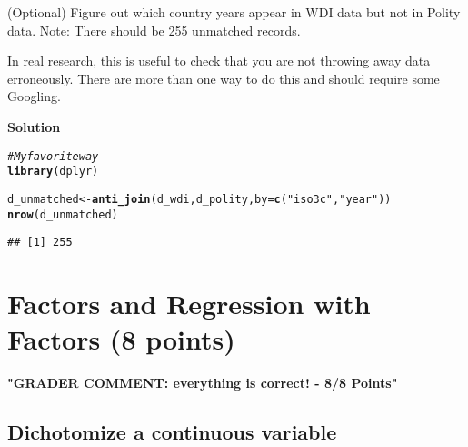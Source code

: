 \documentclass{article}\usepackage[]{graphicx}\usepackage[]{color}
\makeatletter
\newcommand{\hlstr}[1]{\textcolor[rgb]{0.192,0.494,0.8}{#1}}%
\newcommand{\hlcom}[1]{\textcolor[rgb]{0.678,0.584,0.686}{\textit{#1}}}%
\newcommand{\hlstd}[1]{\textcolor[rgb]{0.345,0.345,0.345}{#1}}%
\newcommand{\hlkwb}[1]{\textcolor[rgb]{0.69,0.353,0.396}{#1}}%
\newcommand{\hlkwc}[1]{\textcolor[rgb]{0.333,0.667,0.333}{#1}}%
\newcommand{\hlkwd}[1]{\textcolor[rgb]{0.737,0.353,0.396}{\textbf{#1}}}%
\newenvironment{kframe}{%
 \def\at@end@of@kframe{}%
 \ifinner\ifhmode%
  \def\at@end@of@kframe{\end{minipage}}%
  \begin{minipage}{\columnwidth}%
 \fi\fi%
 \def\FrameCommand##1{\hskip\@totalleftmargin \hskip-\fboxsep
 \colorbox{shadecolor}{##1}\hskip-\fboxsep
     \hskip-\linewidth \hskip-\@totalleftmargin \hskip\columnwidth}%
 \MakeFramed {\advance\hsize-\width
   \@totalleftmargin\z@ \linewidth\hsize
   \@setminipage}}%
 {\par\unskip\endMakeFramed%
 \at@end@of@kframe}
\newenvironment{knitrout}{}{} %
\makeatother
\begin{document}
(Optional) Figure out which country years appear in WDI data but not in Polity data. Note: There should be 255 unmatched records.

In real research, this is useful to check that you are not throwing away data erroneously. There are more than one way to do this and should require some Googling.

\textbf{Solution}

\begin{knitrout}
\color{fgcolor}\begin{kframe}
\begin{alltt}
\hlcom{# My favorite way}
\hlkwd{library}\hlstd{(dplyr)}
\end{alltt}


{\ttfamily\noindent\itshape\color{messagecolor}{\#\# \\\#\# Attaching package: 'dplyr'\\\#\# \\\#\# The following objects are masked from 'package:stats':\\\#\# \\\#\#\ \ \ \  filter, lag\\\#\# \\\#\# The following objects are masked from 'package:base':\\\#\# \\\#\#\ \ \ \  intersect, setdiff, setequal, union}}\begin{alltt}
\hlstd{d_unmatched} \hlkwb{<-} \hlkwd{anti_join}\hlstd{(d_wdi, d_polity,} \hlkwc{by} \hlstd{=} \hlkwd{c}\hlstd{(}\hlstr{"iso3c"}\hlstd{,} \hlstr{"year"}\hlstd{))}
\hlkwd{nrow}\hlstd{(d_unmatched)}
\end{alltt}
\begin{verbatim}
## [1] 255
\end{verbatim}
\end{kframe}
\end{knitrout}

\section{Factors and Regression with Factors (8 points)}

\textbf{\color{red} "GRADER COMMENT: everything is correct! - 8/8 Points"}

\subsection{Dichotomize a continuous variable}
\end{document}
